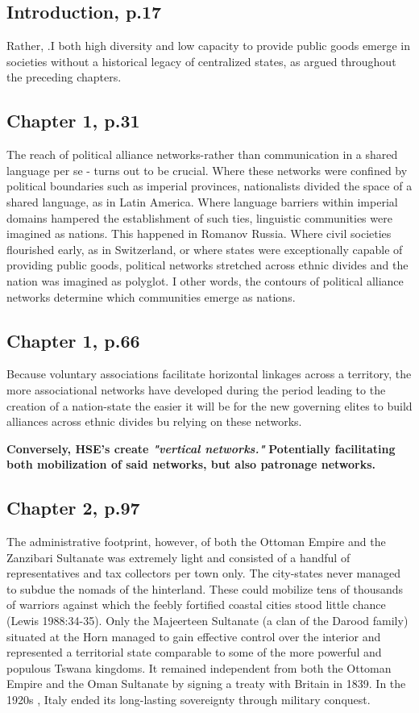 \documentclass[12pt]{article}
\begin{document}
\subsection{Introduction, p.17}

Rather, .I both high diversity and low capacity to provide public goods emerge
in societies without a historical legacy of centralized states, as argued
throughout the preceding chapters.

\subsection{Chapter 1, p.31}

The reach of political alliance networks-rather than communication in a shared
language per se - turns out to be crucial.  Where these networks were confined
by political boundaries such as imperial provinces, nationalists divided the
space of a shared language, as in Latin America.  Where language barriers within
imperial domains hampered the establishment of such ties, linguistic communities
were imagined as nations.  This happened in Romanov Russia.  Where civil
societies flourished early, as in Switzerland, or where states were
exceptionally capable of providing public goods, political networks stretched
across ethnic divides and the nation was imagined as polyglot.  I other words,
the contours of political alliance networks determine which communities emerge
as nations.

\subsection{Chapter 1, p.66}

Because voluntary associations facilitate horizontal linkages across a
territory, the more associational networks have developed during the period
leading to the creation of a nation-state the easier it will be for the new
governing elites to build alliances across ethnic divides bu relying on these
networks.

\textbf{Conversely, HSE's create \textit{"vertical networks."}}
\textbf{Potentially facilitating both mobilization of said networks, but also
patronage networks.} 

\subsection{Chapter 2, p.97}
The administrative footprint, however, of both the Ottoman Empire and the
Zanzibari Sultanate was extremely light and consisted of a handful of
representatives and tax collectors per town only.  The city-states never managed
to subdue the nomads of the hinterland.  These could mobilize tens of thousands
of warriors against which the feebly fortified coastal cities stood little
chance (Lewis 1988:34-35).  Only the Majeerteen Sultanate (a clan of the Darood
family) situated at the Horn managed to gain effective control over the interior
and represented a territorial state comparable to some of the more powerful and
populous Tswana kingdoms.  It remained independent from both the Ottoman Empire
and the Oman Sultanate by signing a treaty with Britain in 1839.  In the 1920s ,
Italy ended its long-lasting sovereignty through military conquest.
\end{document}
